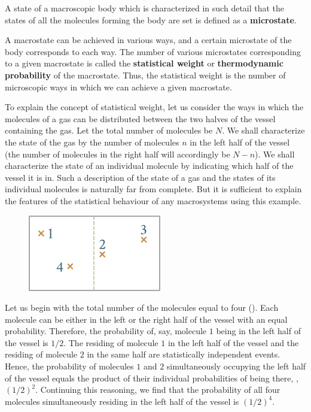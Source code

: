 A state of a macroscopic body which is characterized in such detail that the states of all the molecules forming the body are set is defined as a \textbf{microstate}.

A macrostate can be achieved in various ways, and a certain microstate of the body corresponds to each way. The number of various microstates corresponding to a given macrostate is called the \textbf{statistical weight} or \textbf{thermodynamic probability} of the macrostate. Thus, the statistical weight is the number of microscopic ways in which we can achieve a given macrostate.

To explain the concept of statistical weight, let us consider the ways in which the molecules of a gas can be distributed between the two halves of the vessel containing the gas. Let the total number of molecules be $N$. We shall characterize the state of the gas by the number of molecules $n$ in the left half of the vessel (the number of molecules in the right half will accordingly be $N-n$). We shall characterize the state of an individual molecule by indicating which half of the vessel it is in. Such a description of the state of a gas and the states of its individual molecules is naturally far from complete. But it is sufficient to explain the features of the statistical behaviour of any macrosystems using this example.

\begin{figure}[t]
	\begin{center}
		\includegraphics[scale=1.0]{figures/ch_11/fig_11_24.pdf}
		\caption[]{}
		\label{fig:11_24}
	\end{center}
	\vspace{-0.8cm}
\end{figure}

Let us begin with the total number of the molecules equal to four (). Each molecule can be either in the left or the right half of the vessel with an equal probability. Therefore, the probability of, say, molecule $1$ being in the left half of the vessel is $1/2$. The residing of molecule $1$ in the left half of the vessel and the residing of molecule $2$ in the same half are statistically independent events. Hence, the probability of molecules $1$ and $2$ simultaneously occupying the left half of the vessel equals the product of their individual probabilities of being there, \ie, $(1/2)^2$. Continuing this reasoning, we find that the probability of all four molecules simultaneously residing in the left half of the vessel is $(1/2)^4$.

